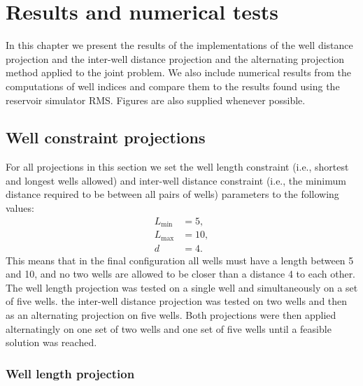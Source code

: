\chapter{Results and numerical tests} 
In this chapter we present the results of the implementations
of the well distance projection and the inter-well distance 
projection and the alternating projection method applied to the
joint problem. We also include numerical results from the computations
of well indices and compare them to the results found using 
the reservoir simulator RMS. Figures are also supplied whenever
possible. 
%
\section{Well constraint projections}
%
For all projections in this section we set the well length constraint 
(i.e., shortest and longest wells allowed) and inter-well distance 
constraint (i.e., the minimum distance required to be between all 
pairs of wells) parameters to the following values:
%
\begin{align}
L_{\min} &= 5,  \\
L_{\max} &= 10, \\
d &= 4.
\label{eq:constraint_parameters}
\end{align}
%
This means that in the final configuration all wells must have a 
length between 5 and 10, and no two wells are allowed to be 
closer than a distance 4 to each other.
%
The well length projection was tested on a single well and 
simultaneously on a set of five wells. the inter-well distance 
projection was tested on two wells and then as an alternating projection
on five wells. Both projections were then applied alternatingly on one
set of two wells and one set of five wells until a feasible solution was 
reached.
%
\subsection{Well length projection}
%
%
